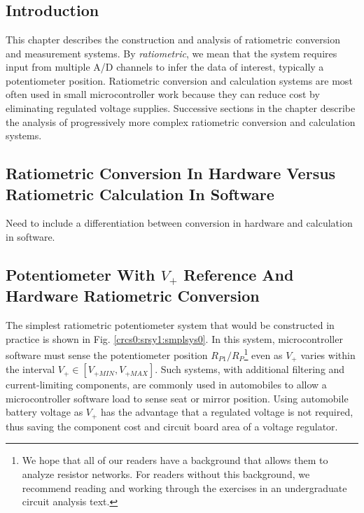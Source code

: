 
\chapter[\crcszeroshorttitle{}]{\crcszerolongtitle{}}

\label{crcs0}


\section{Introduction}

This chapter describes the construction and analysis of ratiometric conversion and
measurement systems.  By \emph{ratiometric}, we mean that the system requires input
from multiple A/D channels to infer the data of interest, typically a potentiometer
position.  Ratiometric conversion and calculation systems are most often used in
small microcontroller work because they can reduce cost by eliminating regulated
voltage supplies.  Successive sections in the chapter describe the analysis of progressively
more complex ratiometric conversion and calculation systems.


\section{Ratiometric Conversion In Hardware Versus Ratiometric Calculation In Software}

Need to include a differentiation between conversion in hardware and
calculation in software.


%
\section{Potentiometer With $V_{+}$ Reference And Hardware Ratiometric Conversion}

The simplest ratiometric potentiometer system
that would be constructed in practice
is shown in Fig. \ref{crcs0:srsy1:smplsys0}.
In this system, microcontroller software must sense
the potentiometer position $R_{P1}/R_P$\footnote{We hope that
all of our readers have a background that allows them to
analyze resistor networks.  For readers without this background,
we recommend reading and working through the exercises in an
undergraduate circuit analysis text.} even as
$V_{+}$ varies within the interval
$V_{+} \in [V_{+MIN}, V_{+MAX}]$.  Such systems, with
additional filtering and current-limiting components,
are commonly used in automobiles to allow a microcontroller
software load to sense seat or
mirror position.
Using automobile battery voltage as $V_{+}$
has the advantage that a regulated voltage is not
required, thus saving the component cost and circuit board
area of a voltage regulator.

